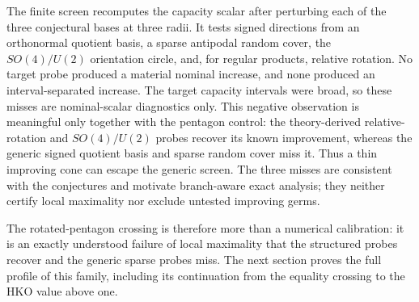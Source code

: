 The finite screen recomputes the capacity scalar after perturbing each of the
three conjectural bases at three radii.  It tests signed directions from an
orthonormal quotient basis, a sparse antipodal random cover, the
\(SO(4)/U(2)\) orientation circle, and, for regular products, relative
rotation.  No target probe produced a material nominal increase, and none
produced an interval-separated increase.  The target capacity intervals were
broad, so these misses are nominal-scalar diagnostics only.  This negative
observation is meaningful only together with the pentagon control:
the theory-derived relative-rotation and \(SO(4)/U(2)\) probes recover its
known improvement, whereas the generic signed quotient basis and sparse
random cover miss it.  Thus a thin improving cone can escape the generic
screen.  The three misses are consistent with the conjectures and motivate
branch-aware exact analysis; they neither certify local maximality nor exclude
untested improving germs.

The rotated-pentagon crossing is therefore more than a numerical calibration:
it is an exactly understood failure of local maximality that the structured
probes recover and the generic sparse probes miss.  The next section proves
the full profile of this family, including its continuation from the equality
crossing to the HKO value above one.
